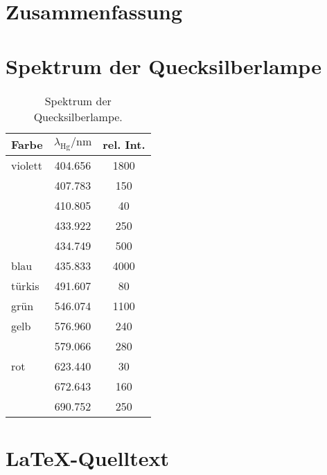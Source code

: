 \section{Zusammenfassung}


\FloatBarrier
\begin{appendix}
    \section{Spektrum der Quecksilberlampe}
    \label{sec:spektrum}

    \begin{table}[htbp]
        \centering
        \begin{tabular}{lSS}
            Farbe & {$\lambda_\text{Hg} / \si{\nano\meter}$} & {rel. Int.} \\
            \hline
            violett & 404.656 & 1800 \\
                    & 407.783 & 150 \\
                    & 410.805 & 40 \\
                    & 433.922 & 250 \\
                    & 434.749 & 500 \\
            blau & 435.833 & 4000 \\
            türkis & 491.607 & 80 \\
            grün & 546.074 & 1100 \\
            gelb & 576.960 & 240 \\
                 & 579.066 & 280 \\
            rot & 623.440 & 30 \\
                & 672.643 & 160 \\
                & 690.752 & 250
        \end{tabular}
        \caption{%
            Spektrum der Quecksilberlampe.
            \cite[P402.6.1]{physik412-Anleitung}
        }
        \label{tab:messdaten:gitterkonstante}
    \end{table}

    \section{\LaTeX-Quelltext}


\end{appendix}
